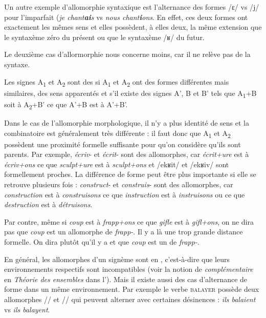 Un autre exemple d’allomorphie syntaxique est l’alternance des formes /ɛ/ vs /j/ pour l’imparfait (\textit{je chant\textbf{ai}s} vs \textit{nous chant\textbf{i}ons}. En effet, ces deux formes ont exactement les mêmes sens et elles possèdent, à elles deux, la même extension que le syntaxème zéro du présent ou que le syntaxème /ʁ/ du futur.

Le deuxième cas d’allormorphie nous concerne moins, car il ne relève pas de la syntaxe.

{Les signes A\textsubscript{1} et A\textsubscript{2} sont des  si A\textsubscript{1} et A\textsubscript{2} ont des formes différentes mais similaires, des sens apparentés et s’il existe des signes A’, B et B’ tels que A\textsubscript{1}+B soit à A\textsubscript{2}+B’ ce que A’+B est à A’+B’.}

Dans le cas de l’allomorphie morphologique, il n’y a plus identité de sens et la combinatoire est généralement très différente : il faut donc que A\textsubscript{1} et A\textsubscript{2} possèdent une proximité formelle suffisante pour qu’on considère qu’ils sont parents. Par exemple, \textit{écriv}{}- et \textit{écrit}{}- sont des allomorphes, car \textit{écrit+ure} est à \textit{écriv+ons} ce que \textit{sculpt+ure} est à \textit{sculpt+ons} et /ekʁit/ et /ekʁiv/ sont formellement proches. La différence de forme peut être plus importante si elle se retrouve plusieurs fois : \textit{construct}{}- et \textit{construis}{}- sont des allomorphes, car \textit{construction} est à \textit{construisons} ce que \textit{instruction} est à \textit{instruisons} ou ce que \textit{destruction} est à \textit{détruisons}.

Par contre, même si \textit{coup} est à \textit{frapp+ons} ce que \textit{gifle} est à \textit{gifl+ons}, on ne dira pas que \textit{coup} est un allomorphe de \textit{frapp-}. Il y a là une trop grande distance formelle. On dira plutôt qu'il y a  et que \textit{coup} est un  de \textit{frapp-}.

En général, les allomorphes d’un signème sont en , c’est-à-dire que leurs environnements respectifs sont incompatibles (voir la notion de \textit{complémentaire} en \textit{Théorie des ensembles} dans l'). Mais il existe aussi des cas d’alternance de forme dans un même environnement. Par exemple le verbe \textsc{balayer} possède deux allomorphes // et // qui peuvent alterner avec certaines désinences : \textit{ils balaient} vs \textit{ils balayent}.

